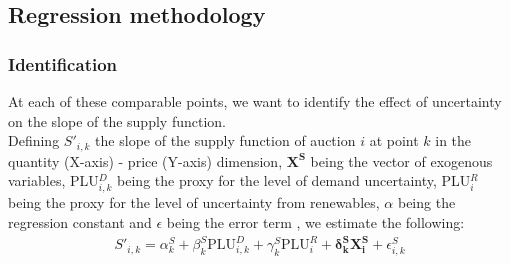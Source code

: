 \subsection{Regression methodology}
\subsubsection{Identification}
\label{identification}
At each of these comparable points, %
we want to identify the effect of uncertainty on the slope of the supply function. \\%


Defining $S'_{i,k}$ the slope of the supply function of auction $i$ at point $k$ in the quantity (X-axis) - price (Y-axis) dimension, %
$\boldsymbol{X^S}$ being the vector of exogenous variables, PLU$^D_{i,k}$ being the proxy for the level of demand uncertainty, PLU$^R_i$ being the proxy for the level of uncertainty from renewables, $\alpha$ being the regression constant and $\epsilon$ being the error term%
, we estimate the following:
\begin{eqnarray}
\label{secondstagereg2}
S'_{i,k} =\alpha_{k}^S+ \beta_{k}^S \text{PLU}^D_{i,k} + \gamma_{k}^S \text{PLU}^R_{i} + \boldsymbol{\delta_{k}^S X^S_i}+\epsilon_{i,k}^S
\end{eqnarray}

